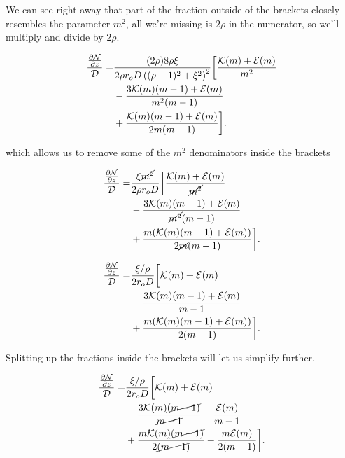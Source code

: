 \noindent We can see right away that part of the fraction outside of the brackets closely resembles the parameter \(m^2\), all we're missing is \(2\rho\) in the numerator, so we'll multiply and divide by \(2 \rho\).

\begin{equation}
    \begin{split}
        \frac{\frac{\partial \mathcal{N}}{\partial z}}{\mathcal{D}} =& \frac{(2\rho)8\rho \xi}{2\rho r_o D \left((\rho+1)^2 + \xi^2\right)^2} \bigg[ \frac{\mathcal{K}(m)+\mathcal{E}(m)}{m^2}\\
         &- \frac{3\mathcal{K}(m)(m-1)+\mathcal{E}(m)}{m^2(m-1)}\\
         &+ \frac{\mathcal{K}(m)(m-1)+\mathcal{E}(m)}{2m(m-1)} \bigg].
    \end{split}
\end{equation}

\noindent which allows us to remove some of the \(m^2\) denominators inside the brackets

\begin{equation}
    \begin{split}
        \frac{\frac{\partial \mathcal{N}}{\partial z}}{\mathcal{D}} =& \frac{\xi\cancel{m^2}}{2\rho r_o D} \bigg[ \frac{\mathcal{K}(m)+\mathcal{E}(m)}{\cancel{m^2}}\\
         &- \frac{3\mathcal{K}(m)(m-1)+\mathcal{E}(m)}{\cancel{m^2}(m-1)}\\
         &+ \frac{m(\mathcal{K}(m)(m-1)+\mathcal{E}(m))}{2\cancel{m}(m-1)} \bigg].
    \end{split}
\end{equation}

\begin{equation}
    \begin{split}
        \frac{\frac{\partial \mathcal{N}}{\partial z}}{\mathcal{D}} =& \frac{\xi/\rho}{2r_o D} \bigg[ \mathcal{K}(m)+\mathcal{E}(m)\\
         &- \frac{3\mathcal{K}(m)(m-1)+\mathcal{E}(m)}{m-1}\\
         &+ \frac{m(\mathcal{K}(m)(m-1)+\mathcal{E}(m))}{2(m-1)} \bigg].
    \end{split}
\end{equation}

\noindent Splitting up the fractions inside the brackets will let us simplify further.

\begin{equation}
    \begin{split}
        \frac{\frac{\partial \mathcal{N}}{\partial z}}{\mathcal{D}} =& \frac{\xi/\rho}{2r_o D} \bigg[ \mathcal{K}(m)+\mathcal{E}(m)\\
         &- \frac{3\mathcal{K}(m)\cancel{(m-1)}}{\cancel{m-1}} - \frac{\mathcal{E}(m)}{m-1}\\
         &+ \frac{m\mathcal{K}(m)\cancel{(m-1)}}{2\cancel{(m-1)}} + \frac{m\mathcal{E}(m)}{2(m-1)} \bigg].
\end{split}
\end{equation}

